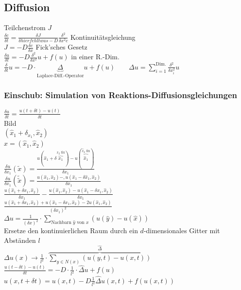 \subsection{Diffusion}
Teilchenstrom $J$ \\
$ \frac{\delta c}{\delta t} = \frac{\delta J}{\delta hier fehlt was -D } \frac{\delta^2}{\delta x^2 c} $ \qquad Kontinuitätsgleichung \\  %
$ J = -D \frac{\delta c}{\delta x} $ \qquad Fick'sches Gesetz \\
$ \frac{\delta u}{\delta t} = - D \frac{\delta^2}{\delta x^2} u + f(u) $ \qquad in einer R.-Dim. \\
$ \frac{\delta}{\delta t} u = -D \cdot \underbrace{\Delta}_{\text{Laplace-Diff.-Operator}} u  + f(u) \qquad \Delta u = \sum\limits_{i=1}^{\text{Dim.}} \frac{\delta^2}{\delta x_i^2} u $

\subsubsection{Einschub: Simulation von Reaktions-Diffusionsgleichungen}
$ \frac{\delta u}{\delta t} = \frac{u(t + \delta t) - u(t)}{\delta t} $ \\
Bild \\
$ (\hat{x}_1 + \delta_{x_1}, \hat{x}_2) $ \\
$ \hat{x} = (\hat{x}_1, \hat{x}_2) $ \\
$ \frac{\delta u}{\delta x_1}(\tilde{x}) = \frac{u(\hat{x}_1 + \delta \overbrace{x_1}^{x_2 \text{ fix}}) - u(\overbrace{\hat{x}_1}^{\hat{x}_2 \text{ fix}})}{\delta x_1} $ \\
$ \frac{\delta u}{\delta x_1}(\tilde{\tilde{x}}) = \frac{u(\hat{x}_1, \hat{x}_2) -,u(\hat{x}_1 - \delta \hat{x}_1, \hat{x}_2)}{\delta x_1} $ \\
$ \frac{u(\hat{x}_1 + \delta x_1, \hat{x}_2)}{\delta x_1} - \frac{u(\hat{x}_1, \hat{x}_2) - u(\hat{x}_1 - \delta x_1, \hat{x}_2)}{\delta x_1} $ \\
$ \frac{u(\hat{x}_1 + \delta x_1, \hat{x}_2) + u(\hat{x}_1 - \delta x_1, \hat{x}_2) - 2u(\hat{x}_1, \hat{x}_2)}{(\delta x_1)^2} $ \\
$ \Delta u = \frac{1}{(\delta x)^2} \cdot \sum\limits_{\text{Nachbarn } \hat{y} \text{ von }x}(u(\hat{y}) - u(\hat{x})) $ \\
Ersetze den kontinuierlichen Raum durch ein $d$-dimensionales Gitter mit Abständen $l$ \\
$ \Delta u(x) \rightarrow \frac{1}{l^2} \cdot \overbrace{\sum\limits_{y \in N(x)}(u(y, t) - u(x, t))}^{\hat{\Delta}} $ \\
$ \frac{u(t - \delta t) - u(t)}{\delta t} = -D \cdot \frac{1}{l^2} \cdot \hat{\Delta} u + f(u) $ \\
$ u(x, t + \delta t) = u(x, t) -D \frac{1}{l^2} \hat{\Delta} u(x, t) + f(u(x, t)) $ \\
